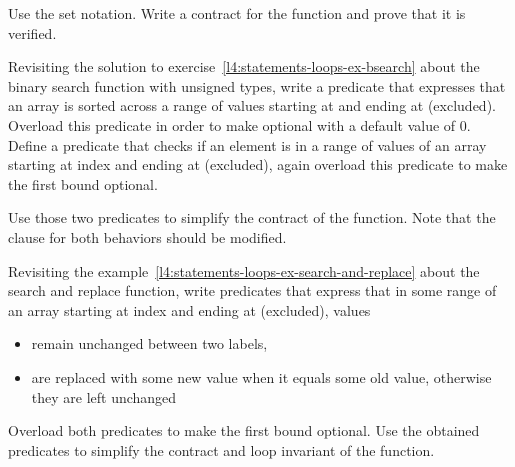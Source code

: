 Use the set notation. Write a contract for the function and prove that it is
verified.


\label{l4:acsl-properties-predicates-ex-bsearch}


Revisiting the solution to
exercise~\ref{l4:statements-loops-ex-bsearch} about the binary search function
with unsigned types, write a predicate that expresses that an array is sorted across
a range of values starting at  and ending at 
(excluded). Overload this predicate in order to make  optional
with a default value of $0$. Define a predicate that checks if an element is in
a range of values of an array starting at index  and ending at
 (excluded), again overload this predicate to make the first
bound optional.

Use those two predicates to simplify the contract of the function. Note that
the  clause for both behaviors should be modified.





Revisiting the example~\ref{l4:statements-loops-ex-search-and-replace} about
the search and replace function, write predicates that express that in some range
of an array starting at index  and ending at 
(excluded), values

\begin{itemize}
\item remain unchanged between two labels,
\item are replaced with some new value when it equals some old value,
  otherwise they are left unchanged
\end{itemize}

Overload both predicates to make the first bound optional. Use the obtained
predicates to simplify the contract and loop invariant of the function.
